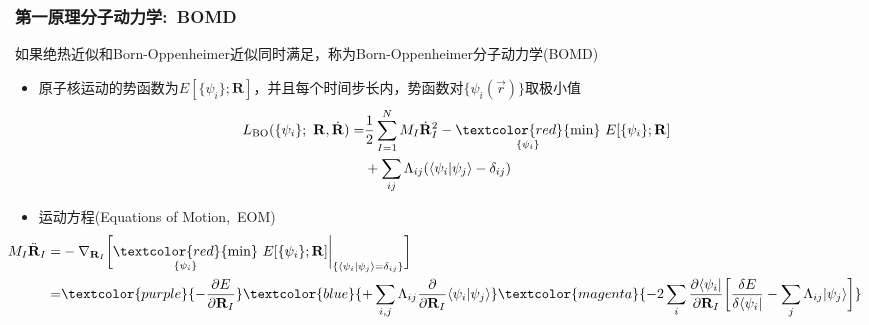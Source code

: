 \frame
{
	\frametitle{第一原理分子动力学:~\textrm{BOMD}}
	如果绝热近似和\textrm{Born-Oppenheimer}近似同时满足，称为\textrm{Born-Oppenheimer}分子动力学\textrm{(BOMD)}
	\begin{itemize}
		\item 原子核运动的势函数为$E[\{\psi_i\};\mathbf{R}]$，并且每个时间步长内，势函数对$\{\psi_i(\vec r)\}$取极小值\\
			\begin{displaymath}
				\begin{aligned}
					L_{\mathrm{BO}}(\{\psi_i\};~\mathbf{R},\dot{\mathbf{R}})=&\dfrac12\sum_{I=1}^NM_I\dot{\mathbf{R}}^2_I-\underset{\{\psi_i\}}{\textcolor{red}{\min}}~E[\{\psi_i\};\mathbf{R}]\\
					&+\sum_{ij}\Lambda_{ij}(\langle\psi_i|\psi_j\rangle-\delta_{ij})
				\end{aligned}
			\end{displaymath}
		\item 运动方程\textrm{(Equations of Motion,~EOM)}
			\begin{displaymath}
				\begin{aligned}
					\hspace*{-40pt}
					M_I\ddot{\mathbf{R}}_I=&-\nabla_{\mathbf{R}_I}\bigg[\underset{\{\psi_i\}}{\textcolor{red}{\min}}~E[\{\psi_i\};\mathbf{R}]\bigg|_{\{\langle\psi_i|\psi_j\rangle=\delta_{ij}\}}\bigg]\\
					=&\textcolor{purple}{-\dfrac{\partial E}{\partial\mathbf{R}_I}}\textcolor{blue}{+\sum_{i,j}\Lambda_{ij}\dfrac{\partial}{\partial \mathbf{R}_I}\langle\psi_i|\psi_j\rangle}\textcolor{magenta}{-2\sum_i\dfrac{\partial\langle\psi_i|}{\partial\mathbf{R}_I}\bigg[\dfrac{\delta E}{\delta\langle\psi_i|}-\sum_j\Lambda_{ij}|\psi_j\rangle\bigg]}
				\end{aligned}
			\end{displaymath}
	\end{itemize}
}

